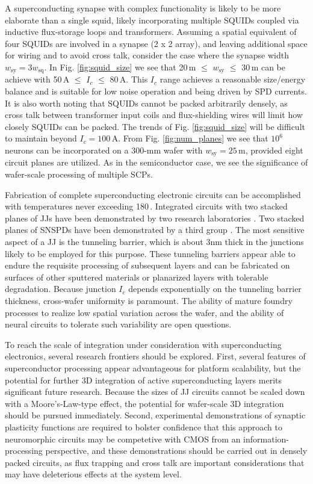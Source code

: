 \documentclass[twocolumn]{article}
\begin{document}
A superconducting synapse with complex functionality is likely to be more elaborate than a single squid, likely incorporating multiple SQUIDs coupled via inductive flux-storage loops and transformers. Assuming a spatial equivalent of four SQUIDs are involved in a synapse (2 x 2 array), and leaving additional space for wiring and to avoid cross talk, consider the case where the synapse width $w_{\mathrm{sy}} = 3w_{\mathrm{sq}}$. In Fig. \ref{fig:squid_size} we see that 20\,\textmu m $\le$ $w_{\mathrm{sy}}$ $\le$ 30\,\textmu m can be achieve with 50\,\textmu A $\le$ $I_c$ $\le$ 80\,\textmu A. This $I_c$ range achieves a reasonable size/energy balance and is suitable for low noise operation and being driven by SPD currents. It is also worth noting that SQUIDs cannot be packed arbitrarily densely, as cross talk between transformer input coils and flux-shielding wires will limit how closely SQUIDs can be packed. The trends of Fig. \ref{fig:squid_size} will be difficult to maintain beyond $I_c = 100$\,\textmu A. From Fig. \ref{fig:num_planes} we see that $10^6$ neurons can be incorporated on a 300-mm wafer with $w_{\mathrm{sy}} = 25$\,\textmu m, provided eight circuit planes are utilized. As in the semiconductor case, we see the significance of wafer-scale processing of multiple SCPs.

Fabrication of complete superconducting electronic circuits can be accomplished with temperatures never exceeding 180\,\textcelsius. Integrated circuits with two stacked planes of JJs have been demonstrated by two research laboratories \cite{tobo2019,anna2017}. Two stacked planes of SNSPDs have been demonstrated by a third group \cite{vema2012}. The most sensitive aspect of a JJ is the tunneling barrier, which is about 3nm thick in the junctions likely to be employed for this purpose. These tunneling barriers appear able to endure the requisite processing of subsequent layers and can be fabricated on surfaces of other sputtered materials or planarized layers with tolerable degradation. Because junction $I_c$ depends exponentially on the tunneling barrier thickness, cross-wafer uniformity is paramount. The ability of mature foundry processes to realize low spatial variation across the wafer, and the ability of neural circuits to tolerate such variability are open questions.

To reach the scale of integration under consideration with superconducting electronics, several research frontiers should be explored. First, several features of superconductor processing appear advantageous for platform scalability, but the potential for further 3D integration of active superconducting layers merits significant future research. Because the sizes of JJ circuits cannot be scaled down with a Moore's-Law-type effect, the potential for wafer-scale 3D integration should be pursued immediately. Second, experimental demonstrations of synaptic plasticity functions are required to bolster confidence that this approach to neuromorphic circuits may be competetive with CMOS from an information-processing perspective, and these demonstrations should be carried out in densely packed circuits, as flux trapping and cross talk are important considerations that may have deleterious effects at the system level. 
\end{document}
